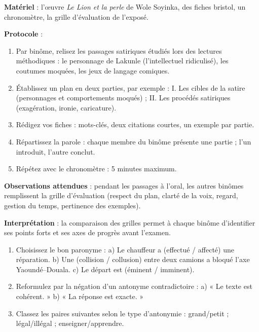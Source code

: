 \documentclass[11pt]{article}
\begin{document}
\begin{experience}
\textbf{Matériel} : l'œuvre \emph{Le Lion et la perle} de Wole Soyinka, des fiches bristol, un chronomètre, la grille d'évaluation de l'exposé.\par
\textbf{Protocole} :
\begin{enumerate}
\item Par binôme, relisez les passages satiriques étudiés lors des lectures méthodiques : le personnage de Lakunle (l'intellectuel ridiculisé), les coutumes moquées, les jeux de langage comiques.
\item Établissez un plan en deux parties, par exemple : I. Les cibles de la satire (personnages et comportements moqués) ; II. Les procédés satiriques (exagération, ironie, caricature).
\item Rédigez vos fiches : mots-clés, deux citations courtes, un exemple par partie.
\item Répartissez la parole : chaque membre du binôme présente une partie ; l'un introduit, l'autre conclut.
\item Répétez avec le chronomètre : 5 minutes maximum.
\end{enumerate}
\textbf{Observations attendues} : pendant les passages à l'oral, les autres binômes remplissent la grille d'évaluation (respect du plan, clarté de la voix, regard, gestion du temps, pertinence des exemples).\par
\textbf{Interprétation} : la comparaison des grilles permet à chaque binôme d'identifier ses points forts et ses axes de progrès avant l'examen.
\end{experience}

\begin{exercice}
\begin{enumerate}
\item Choisissez le bon paronyme : a) Le chauffeur a (effectué / affecté) une réparation. b) Une (collision / collusion) entre deux camions a bloqué l'axe Yaoundé--Douala. c) Le départ est (éminent / imminent).
\item Reformulez par la négation d'un antonyme contradictoire : a) « Le texte est cohérent. » b) « La réponse est exacte. »
\item Classez les paires suivantes selon le type d'antonymie : grand/petit ; légal/illégal ; enseigner/apprendre.
\end{enumerate}
\end{exercice}
\end{document}
